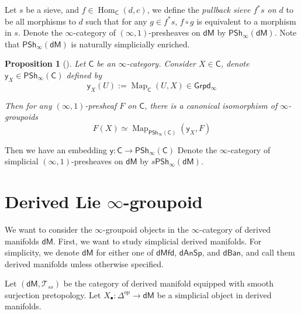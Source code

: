 \documentclass[12pt]{amsart}
\newtheorem{prop}[thm]{Proposition}
\theoremstyle{definition}
\theoremstyle{remark}
\numberwithin{equation}{section}
\newcommand{\CC}{{\mathsf C}}
\newcommand{\1}{{\mathbb{1}}}
\newcommand{\y}{\mathsf{y}}
\newcommand{\dm}{\mathsf{dM}}
\newcommand{\dmfd}{\mathsf{dMfd}}
\newcommand{\dan}{\mathsf{dAnSp}}
\newcommand{\dban}{\mathsf{dBan}}
\newcommand{\igpd}{\mathsf{Grpd_{\infty}}}
\newcommand{\pshi}{\mathsf{PSh_{\infty}}}
\newcommand{\Hom}{\operatorname{Hom}}
\newcommand{\map}{\operatorname{Map}}
\begin{document}
Let $s$ be a sieve, and $f\in \Hom_{\mathsf{C}}(d,c)$, we define the {\it pullback sieve $f^*s$ on $d$} to be all morphisms to $d$ such that for any $g\in f^*s$, $f\circ g$ is equivalent to a morphism in $s$.
Denote the $\infty$-category of $(\infty,1)$-presheaves on $\dm$ by $\pshi(\dm)$. Note that $\pshi(\dm)$ is naturally simplicially enriched.

\begin{prop}[\cite{Lur09a}]
	Let $\CC$ be an $\infty$-category. Consider $X\in \CC$, denote $\y_X \in \pshi(\CC)$ defined by
	\begin{equation*}
	\y_X(U) := \map_{\CC}(U,X) \in \igpd
	\end{equation*}
	
	Then for any $(\infty,1)$-presheaf $F$ on $\CC$, there is a canonical isomorphism of $\infty$-groupoids
	\begin{equation*}
	F(X) \simeq \map_{\pshi(\CC)} (\y_X, F)
	\end{equation*}
\end{prop}  

Then we have an embedding $\y: \CC \to \pshi(\CC)$
Denote the $\infty$-category of simplicial $(\infty,1)$-presheaves on $\dm$ by $s\pshi(\dm)$.


\section{Derived Lie $\infty$-groupoid}
We want to consider the $\infty$-groupoid objects in the $\infty$-category of derived manifolds $\dm$. First, we want to study simplicial derived manifolds. For simplicity, we denote $\dm$ for either one of $\dmfd$, $\dan$, and $\dban$, and call them derived manifolds unless otherwise specified.

Let $(\dm, \mathcal{T}_{ss})$ be the category of derived manifold equipped with smooth surjection pretopology. Let $X_{\bullet}: \Delta^{op}\to \dm$ be a simplicial object in derived manifolds.
\end{document}
